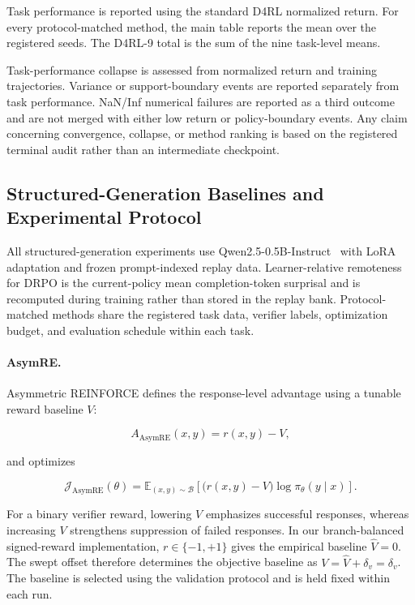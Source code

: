 \documentclass{article}
\theoremstyle{plain}
\theoremstyle{definition}
\theoremstyle{remark}
\begin{document}
Task performance is reported using the standard D4RL normalized return.
For every protocol-matched method, the main table reports the mean over
the registered seeds. The D4RL-9 total is the sum of
the nine task-level means.

Task-performance collapse is assessed from normalized return and
training trajectories. Variance or support-boundary events are reported
separately from task performance. NaN/Inf numerical failures are
reported as a third outcome and are not merged with either low return or
policy-boundary events. Any claim concerning convergence, collapse, or
method ranking is based on the registered terminal audit rather than an
intermediate checkpoint.


\subsection{Structured-Generation Baselines and Experimental Protocol}
\label{app:structured_generation_methods}

All structured-generation experiments use
Qwen2.5-0.5B-Instruct~\citep{qwen2024qwen25} with LoRA adaptation and
frozen prompt-indexed replay data. Learner-relative remoteness for DRPO is
the current-policy mean completion-token surprisal and is recomputed during
training rather than stored in the replay bank. Protocol-matched methods
share the registered task data, verifier labels, optimization budget, and
evaluation schedule within each task.

\paragraph{AsymRE.}

Asymmetric REINFORCE defines the response-level advantage using a
tunable reward baseline \(V\):

\[
A_{\mathrm{AsymRE}}(x,y)
=
r(x,y)-V,
\]

and optimizes

\[
\mathcal{J}_{\mathrm{AsymRE}}(\theta)
=
\mathbb{E}_{(x,y)\sim\mathcal{B}}
\left[
\bigl(r(x,y)-V\bigr)
\log\pi_\theta(y\mid x)
\right].
\]

For a binary verifier reward, lowering \(V\) emphasizes successful
responses, whereas increasing \(V\) strengthens suppression of failed
responses. In our branch-balanced signed-reward implementation,
\(r\in\{-1,+1\}\) gives the empirical baseline
\(\widehat V=0\). The swept offset therefore determines the
objective baseline as
\(V=\widehat V+\delta_v=\delta_v\). The baseline is selected using the validation protocol and
is held fixed within each run.
\end{document}
